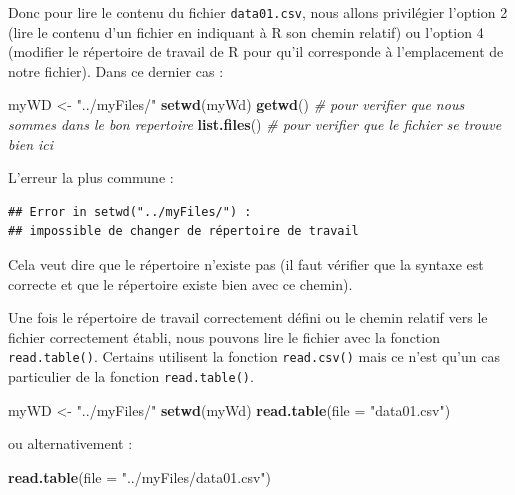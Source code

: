 \documentclass[]{book}
\newenvironment{Shaded}{\begin{snugshade}}{\end{snugshade}}
\newcommand{\CommentTok}[1]{\textcolor[rgb]{0.56,0.35,0.01}{\textit{#1}}}
\newcommand{\DataTypeTok}[1]{\textcolor[rgb]{0.13,0.29,0.53}{#1}}
\newcommand{\KeywordTok}[1]{\textcolor[rgb]{0.13,0.29,0.53}{\textbf{#1}}}
\newcommand{\NormalTok}[1]{#1}
\newcommand{\StringTok}[1]{\textcolor[rgb]{0.31,0.60,0.02}{#1}}
\begin{document}
Donc pour lire le contenu du fichier \texttt{data01.csv}, nous allons privilégier l'option 2 (lire le contenu d'un fichier en indiquant à R son chemin relatif) ou l'option 4 (modifier le répertoire de travail de R pour qu'il corresponde à l'emplacement de notre fichier). Dans ce dernier cas :

\begin{Shaded}
\begin{Highlighting}[]
\NormalTok{myWD <-}\StringTok{ "../myFiles/"}
\KeywordTok{setwd}\NormalTok{(myWd)}
\KeywordTok{getwd}\NormalTok{() }\CommentTok{# pour verifier que nous sommes dans le bon repertoire}
\KeywordTok{list.files}\NormalTok{() }\CommentTok{# pour verifier que le fichier se trouve bien ici}
\end{Highlighting}
\end{Shaded}

L'erreur la plus commune :

\begin{verbatim}
## Error in setwd("../myFiles/") : 
## impossible de changer de répertoire de travail
\end{verbatim}

Cela veut dire que le répertoire n'existe pas (il faut vérifier que la syntaxe est correcte et que le répertoire existe bien avec ce chemin).

Une fois le répertoire de travail correctement défini ou le chemin relatif vers le fichier correctement établi, nous pouvons lire le fichier avec la fonction \texttt{read.table()}. Certains utilisent la fonction \texttt{read.csv()} mais ce n'est qu'un cas particulier de la fonction \texttt{read.table()}.

\begin{Shaded}
\begin{Highlighting}[]
\NormalTok{myWD <-}\StringTok{ "../myFiles/"}
\KeywordTok{setwd}\NormalTok{(myWd)}
\KeywordTok{read.table}\NormalTok{(}\DataTypeTok{file =} \StringTok{"data01.csv"}\NormalTok{)}
\end{Highlighting}
\end{Shaded}

ou alternativement :

\begin{Shaded}
\begin{Highlighting}[]
\KeywordTok{read.table}\NormalTok{(}\DataTypeTok{file =} \StringTok{"../myFiles/data01.csv"}\NormalTok{)}
\end{Highlighting}
\end{Shaded}
\end{document}
